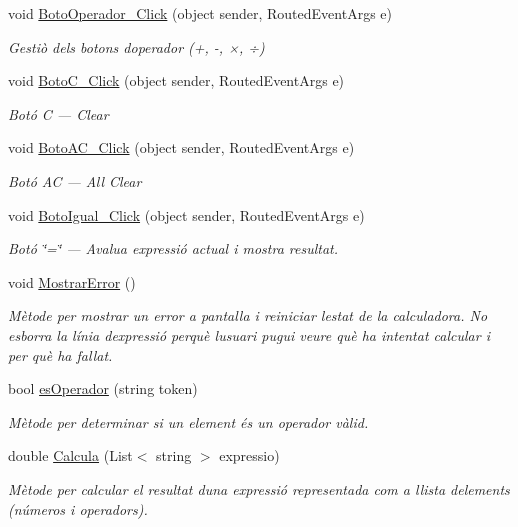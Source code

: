 \begin{DoxyCompactItemize}
void \mbox{\hyperlink{class_p_a_c4___calculadora_1_1_main_window_a0e517e85785a6d5c4416c1799ff83f74}{Boto\+Operador\+\_\+\+Click}} (object sender, Routed\+Event\+Args e)
\begin{DoxyCompactList}\small\item\em Gestiò dels botons d\textquotesingle{}operador (+, -\/, ×, ÷) \end{DoxyCompactList}\item 
void \mbox{\hyperlink{class_p_a_c4___calculadora_1_1_main_window_ab1645c298f24fcedef1ad01c81f3da86}{Boto\+C\+\_\+\+Click}} (object sender, Routed\+Event\+Args e)
\begin{DoxyCompactList}\small\item\em Botó C — Clear \end{DoxyCompactList}\item 
void \mbox{\hyperlink{class_p_a_c4___calculadora_1_1_main_window_ac90763ab3827e3b9dac17a80f9303b25}{Boto\+A\+C\+\_\+\+Click}} (object sender, Routed\+Event\+Args e)
\begin{DoxyCompactList}\small\item\em Botó AC — All Clear \end{DoxyCompactList}\item 
void \mbox{\hyperlink{class_p_a_c4___calculadora_1_1_main_window_a4c90e856d7eeed3dc7566065be69e24c}{Boto\+Igual\+\_\+\+Click}} (object sender, Routed\+Event\+Args e)
\begin{DoxyCompactList}\small\item\em Botó \char`\"{}=\char`\"{} — Avalua expressió actual i mostra resultat. \end{DoxyCompactList}\item 
void \mbox{\hyperlink{class_p_a_c4___calculadora_1_1_main_window_a0c53c4846653c6a7f127f4582d0cf449}{Mostrar\+Error}} ()
\begin{DoxyCompactList}\small\item\em Mètode per mostrar un error a pantalla i reiniciar l\textquotesingle{}estat de la calculadora. No esborra la línia d\textquotesingle{}expressió perquè l\textquotesingle{}usuari pugui veure què ha intentat calcular i per què ha fallat. \end{DoxyCompactList}\item 
bool \mbox{\hyperlink{class_p_a_c4___calculadora_1_1_main_window_af6006833170f4d7a2929bc70f6b420de}{es\+Operador}} (string token)
\begin{DoxyCompactList}\small\item\em Mètode per determinar si un element és un operador vàlid. \end{DoxyCompactList}\item 
double \mbox{\hyperlink{class_p_a_c4___calculadora_1_1_main_window_a30d4b4f2024024399de93f57e066e515}{Calcula}} (List$<$ string $>$ expressio)
\begin{DoxyCompactList}\small\item\em Mètode per calcular el resultat d\textquotesingle{}una expressió representada com a llista d\textquotesingle{}elements\textquotesingle{} (números i operadors). \end{DoxyCompactList}\end{DoxyCompactItemize}
